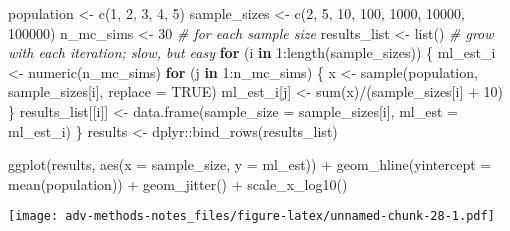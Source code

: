 \documentclass[
]{book}
\newenvironment{Shaded}{\begin{snugshade}}{\end{snugshade}}
\newcommand{\AttributeTok}[1]{\textcolor[rgb]{0.77,0.63,0.00}{#1}}
\newcommand{\CommentTok}[1]{\textcolor[rgb]{0.56,0.35,0.01}{\textit{#1}}}
\newcommand{\ConstantTok}[1]{\textcolor[rgb]{0.00,0.00,0.00}{#1}}
\newcommand{\ControlFlowTok}[1]{\textcolor[rgb]{0.13,0.29,0.53}{\textbf{#1}}}
\newcommand{\DecValTok}[1]{\textcolor[rgb]{0.00,0.00,0.81}{#1}}
\newcommand{\FunctionTok}[1]{\textcolor[rgb]{0.00,0.00,0.00}{#1}}
\newcommand{\NormalTok}[1]{#1}
\newcommand{\OtherTok}[1]{\textcolor[rgb]{0.56,0.35,0.01}{#1}}
\newcommand{\SpecialCharTok}[1]{\textcolor[rgb]{0.00,0.00,0.00}{#1}}
\begin{document}
\begin{Shaded}
\begin{Highlighting}[]
\NormalTok{population }\OtherTok{\textless{}{-}} \FunctionTok{c}\NormalTok{(}\DecValTok{1}\NormalTok{, }\DecValTok{2}\NormalTok{, }\DecValTok{3}\NormalTok{, }\DecValTok{4}\NormalTok{, }\DecValTok{5}\NormalTok{)}
\NormalTok{sample\_sizes }\OtherTok{\textless{}{-}} \FunctionTok{c}\NormalTok{(}\DecValTok{2}\NormalTok{, }\DecValTok{5}\NormalTok{, }\DecValTok{10}\NormalTok{, }\DecValTok{100}\NormalTok{, }\DecValTok{1000}\NormalTok{, }\DecValTok{10000}\NormalTok{, }\DecValTok{100000}\NormalTok{)}
\NormalTok{n\_mc\_sims }\OtherTok{\textless{}{-}} \DecValTok{30}  \CommentTok{\# for each sample size}
\NormalTok{results\_list }\OtherTok{\textless{}{-}} \FunctionTok{list}\NormalTok{()  }\CommentTok{\# grow with each iteration; slow, but easy}
\ControlFlowTok{for}\NormalTok{ (i }\ControlFlowTok{in} \DecValTok{1}\SpecialCharTok{:}\FunctionTok{length}\NormalTok{(sample\_sizes)) \{}
\NormalTok{  ml\_est\_i }\OtherTok{\textless{}{-}} \FunctionTok{numeric}\NormalTok{(n\_mc\_sims)}
  \ControlFlowTok{for}\NormalTok{ (j }\ControlFlowTok{in} \DecValTok{1}\SpecialCharTok{:}\NormalTok{n\_mc\_sims) \{}
\NormalTok{    x }\OtherTok{\textless{}{-}} \FunctionTok{sample}\NormalTok{(population, sample\_sizes[i], }\AttributeTok{replace =} \ConstantTok{TRUE}\NormalTok{)}
\NormalTok{    ml\_est\_i[j] }\OtherTok{\textless{}{-}} \FunctionTok{sum}\NormalTok{(x)}\SpecialCharTok{/}\NormalTok{(sample\_sizes[i] }\SpecialCharTok{+} \DecValTok{10}\NormalTok{)}
\NormalTok{  \}}
\NormalTok{  results\_list[[i]] }\OtherTok{\textless{}{-}} \FunctionTok{data.frame}\NormalTok{(}\AttributeTok{sample\_size =}\NormalTok{ sample\_sizes[i],}
                             \AttributeTok{ml\_est =}\NormalTok{ ml\_est\_i)}
\NormalTok{\}}
\NormalTok{results }\OtherTok{\textless{}{-}}\NormalTok{ dplyr}\SpecialCharTok{::}\FunctionTok{bind\_rows}\NormalTok{(results\_list) }

\FunctionTok{ggplot}\NormalTok{(results, }\FunctionTok{aes}\NormalTok{(}\AttributeTok{x =}\NormalTok{ sample\_size, }\AttributeTok{y =}\NormalTok{ ml\_est)) }\SpecialCharTok{+} 
  \FunctionTok{geom\_hline}\NormalTok{(}\AttributeTok{yintercept =} \FunctionTok{mean}\NormalTok{(population)) }\SpecialCharTok{+} 
  \FunctionTok{geom\_jitter}\NormalTok{() }\SpecialCharTok{+} 
  \FunctionTok{scale\_x\_log10}\NormalTok{()}
\end{Highlighting}
\end{Shaded}

\texttt{[image: adv-methods-notes\_files/figure-latex/unnamed-chunk-28-1.pdf]}
\end{document}
